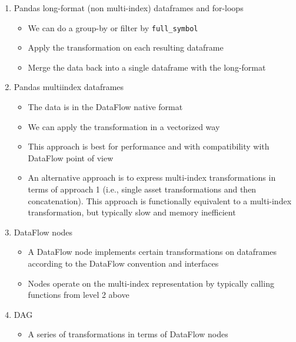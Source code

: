\documentclass[11pt, reqno]{amsart}
\theoremstyle{definition}
\theoremstyle{remark}
\begin{document}
\begin{enumerate}

  \item Pandas long-format (non multi-index) dataframes and for-loops
        \begin{itemize}
          \item We can do a group-by or filter by \verb|full_symbol|
          \item Apply the transformation on each resulting dataframe
          \item Merge the data back into a single dataframe with the long-format
        \end{itemize}

  \item Pandas multiindex dataframes
        \begin{itemize}
          \item The data is in the DataFlow native format
          \item We can apply the transformation in a vectorized way
          \item This approach is best for performance and with compatibility with
                DataFlow point of view
          \item An alternative approach is to express multi-index transformations in
                terms of approach 1 (i.e., single asset transformations and then
                concatenation). This approach is functionally equivalent to a
                multi-index transformation, but typically slow and memory
                inefficient
        \end{itemize}

  \item DataFlow nodes
        \begin{itemize}
          \item A DataFlow node implements certain transformations on dataframes
                according to the DataFlow convention and interfaces
          \item Nodes operate on the multi-index representation by typically calling
                functions from level 2 above
        \end{itemize}

  \item DAG
        \begin{itemize}
          \item A series of transformations in terms of DataFlow nodes
        \end{itemize}
\end{enumerate}
\end{document}
